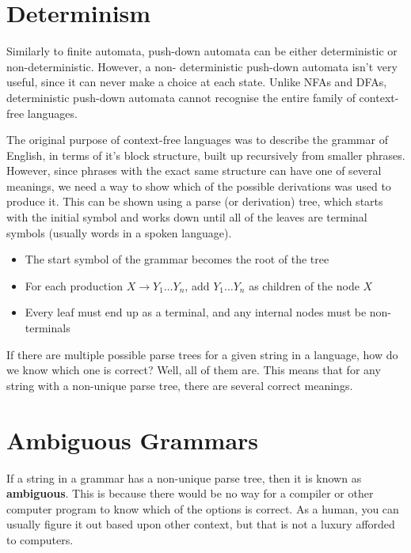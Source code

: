 \section*{Determinism}

Similarly to finite automata, push-down automata can be either deterministic or non-deterministic. However, a non-
deterministic push-down automata isn't very useful, since it can never make a choice at each state. Unlike NFAs and
 DFAs, deterministic push-down automata cannot recognise the entire family of context-free languages.




The original purpose of context-free languages was to describe the grammar of English, in terms of it's block structure,
 built up recursively from smaller phrases. However, since phrases with the exact same structure can have one of several
 meanings, we need a way to show which of the possible derivations was used to produce it. This can be shown using a
 parse (or derivation) tree, which starts with the initial symbol and works down until all of the leaves are terminal
 symbols (usually words in a spoken language).

\begin{itemize}
  \item The start symbol of the grammar becomes the root of the tree
  \item For each production $X \rightarrow Y_1 \ldots Y_n$, add $Y_1 \ldots Y_n$ as children of the node $X$
  \item Every leaf must end up as a terminal, and any internal nodes must be non-terminals
\end{itemize}

If there are multiple possible parse trees for a given string in a language, how do we know which one is correct? Well,
 all of them are. This means that for any string with a non-unique parse tree, there are several correct meanings.

\section*{Ambiguous Grammars}

If a string in a grammar has a non-unique parse tree, then it is known as \textbf{ambiguous}. This is because there
 would be no way for a compiler or other computer program to know which of the options is correct. As a human, you can
 usually figure it out based upon other context, but that is not a luxury afforded to computers.

